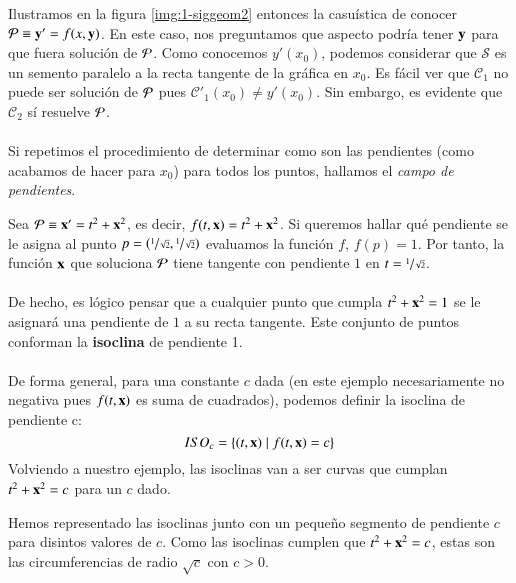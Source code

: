 Ilustramos en la figura \ref{img:1-siggeom2} entonces la casuística de conocer $\P \equiv \mbf{y'} = f(x,\mbf{y})$. En este caso, nos preguntamos que aspecto podría tener $\mbf{y}$ para que fuera solución de $\P$. Como conocemos $y'(x_0)$, podemos considerar que $\mathcal{S}$ es un semento paralelo a la recta tangente de la gráfica en $x_0$. Es fácil ver que $\mathcal{C}_1$ no puede ser solución de $\P$ pues $\mathcal{C}'_1(x_0) \neq y'(x_0)$. Sin embargo, es evidente que $\mathcal{C}_2$ sí resuelve $\P$.\\\\
Si repetimos el procedimiento de determinar como son las pendientes (como acabamos de hacer para $x_0$) para todos los puntos, hallamos el \textit{campo de pendientes}.

\begin{eg}
    Sea $\P \equiv \mbf{x'} = t^2 + \mbf{x}^2$, es decir, $f(t, \mbf{x}) = t^2 + \mbf{x}^2$. Si queremos hallar qué pendiente se le asigna al punto $p = (\sfrac{1}{\sqrt{2}},\sfrac{1}{\sqrt{2}})$ evaluamos la función $f$, $f(p) = 1$. Por tanto, la función $\mbf{x}$ que soluciona $\P$ tiene tangente con pendiente $1$ en $t = \sfrac{1}{\sqrt{2}}$.\\\\
    De hecho, es lógico pensar que a cualquier punto que cumpla $t^2 + \mbf{x}^2 = 1$ se le asignará una pendiente de $1$ a su recta tangente. Este conjunto de puntos conforman la \textbf{isoclina} de pendiente 1.\\\\
    De forma general, para una constante $c$ dada (en este ejemplo necesariamente no negativa pues $f(t, \mbf{x})$ es suma de cuadrados), podemos definir la isoclina de pendiente c:
    $$
    ISO_c = \left\{(t, \mbf{x}) \mid f(t, \mbf{x}) = c\right\}
    $$
    Volviendo a nuestro ejemplo, las isoclinas van a ser curvas que cumplan $t^2 + \mbf{x}^2 = c$ para un $c$ dado.\\
    \begin{minipage}[c]{0.3\linewidth}
      \begin{center}
      \end{center}
    \end{minipage}\hfill
    \begin{minipage}[c]{0.65\textwidth}
        Hemos representado las isoclinas junto con un pequeño segmento de pendiente $c$ para disintos valores de $c$. Como las isoclinas cumplen que $t^2 + \mbf{x}^2 = c$, estas son las circumferencias de radio $\sqrt{c}$ con $c > 0$.\\

\end{minipage}
\end{eg}
